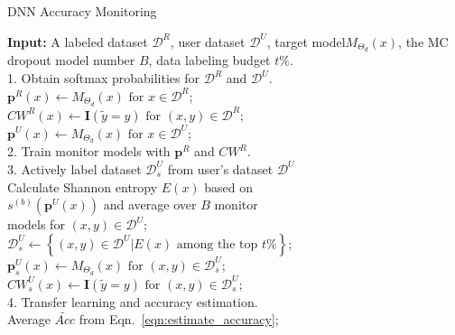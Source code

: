 \documentclass{article}
\newcommand{\cloudModel}{target model\xspace}
\newcommand{\monitors}{monitor models\xspace}
\begin{document}
\begin{algorithm}[!t]
	\caption{DNN Accuracy Monitoring}
	\textbf{Input: }
	A labeled dataset $\mathcal{D}^R$, user dataset $\mathcal{D}^U$, \cloudModel $M_{\Theta_d}(x)$, the MC dropout model number $B$,
data labeling budget $t\%$.\\
	1. Obtain softmax probabilities for $\mathcal{D}^R$ and $\mathcal{D}^U$.\\
	\text{\quad\quad}$\mathbf{p}^R(x) \gets M_{\Theta_d}(x)\text{ for }x \in \mathcal{D}^R$;\\
	\text{\quad\quad}$CW^R(x) \gets \mathbf{I}\left(\tilde{y}=y \right)\text{ for }(x,y) \in \mathcal{D}^R$;\\
	\text{\quad\quad}$\mathbf{p}^U(x) \gets M_{\Theta_d}(x)\text{ for }x \in \mathcal{D}^U$;\\
	2. Train \monitors with $\mathbf{{p}}^R$ and $CW^R$.\\
	3. Actively label dataset $\mathcal{D}_s^U$ from user's dataset $\mathcal{D}^U$\\
	\text{\quad\quad}Calculate Shannon entropy $E(x)$ based on\\
\text{\quad\quad}$s^{(b)}(\mathbf{p}^U(x))$ and average over $B$ monitor\\
\text{\quad\quad} models  for
$(x,y)\in \mathcal{D}^U$;\\
    \text{\quad\quad}$\mathcal{D}_s^U \gets \left\{ (x,y)\in\mathcal{D}^U | E(x) \text{ among the top } t\% \right\}$;\\
	\text{\quad\quad}$\mathbf{{p}}_s^U(x) \gets M_{\Theta_d}(x)\text{ for }(x,y) \in \mathcal{D}_s^U$;\\
	\text{\quad\quad}$CW_s^U(x) \gets \mathbf{I}\left(\tilde{y}=y \right)\text{ for }(x,y)\in \mathcal{D}_s^U$;\\
	4. Transfer learning and accuracy estimation. \\
	\Return Average $\widetilde{Acc}$ from Eqn.~\eqref{eqn:estimate_accuracy};
	\label{algo:monitor_algorithm}
\end{algorithm}
\end{document}
